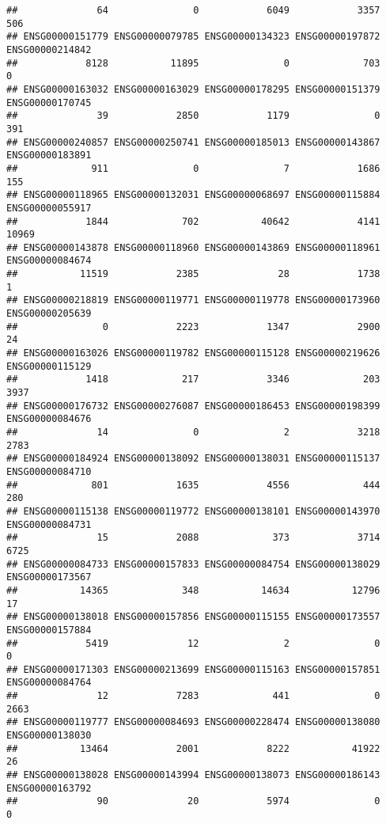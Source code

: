 \documentclass[
]{article}
\begin{document}
\begin{verbatim}
##              64               0            6049            3357             506 
## ENSG00000151779 ENSG00000079785 ENSG00000134323 ENSG00000197872 ENSG00000214842 
##            8128           11895               0             703               0 
## ENSG00000163032 ENSG00000163029 ENSG00000178295 ENSG00000151379 ENSG00000170745 
##              39            2850            1179               0             391 
## ENSG00000240857 ENSG00000250741 ENSG00000185013 ENSG00000143867 ENSG00000183891 
##             911               0               7            1686             155 
## ENSG00000118965 ENSG00000132031 ENSG00000068697 ENSG00000115884 ENSG00000055917 
##            1844             702           40642            4141           10969 
## ENSG00000143878 ENSG00000118960 ENSG00000143869 ENSG00000118961 ENSG00000084674 
##           11519            2385              28            1738               1 
## ENSG00000218819 ENSG00000119771 ENSG00000119778 ENSG00000173960 ENSG00000205639 
##               0            2223            1347            2900              24 
## ENSG00000163026 ENSG00000119782 ENSG00000115128 ENSG00000219626 ENSG00000115129 
##            1418             217            3346             203            3937 
## ENSG00000176732 ENSG00000276087 ENSG00000186453 ENSG00000198399 ENSG00000084676 
##              14               0               2            3218            2783 
## ENSG00000184924 ENSG00000138092 ENSG00000138031 ENSG00000115137 ENSG00000084710 
##             801            1635            4556             444             280 
## ENSG00000115138 ENSG00000119772 ENSG00000138101 ENSG00000143970 ENSG00000084731 
##              15            2088             373            3714            6725 
## ENSG00000084733 ENSG00000157833 ENSG00000084754 ENSG00000138029 ENSG00000173567 
##           14365             348           14634           12796              17 
## ENSG00000138018 ENSG00000157856 ENSG00000115155 ENSG00000173557 ENSG00000157884 
##            5419              12               2               0               0 
## ENSG00000171303 ENSG00000213699 ENSG00000115163 ENSG00000157851 ENSG00000084764 
##              12            7283             441               0            2663 
## ENSG00000119777 ENSG00000084693 ENSG00000228474 ENSG00000138080 ENSG00000138030 
##           13464            2001            8222           41922              26 
## ENSG00000138028 ENSG00000143994 ENSG00000138073 ENSG00000186143 ENSG00000163792 
##              90              20            5974               0               0 

\end{verbatim}
\end{document}
